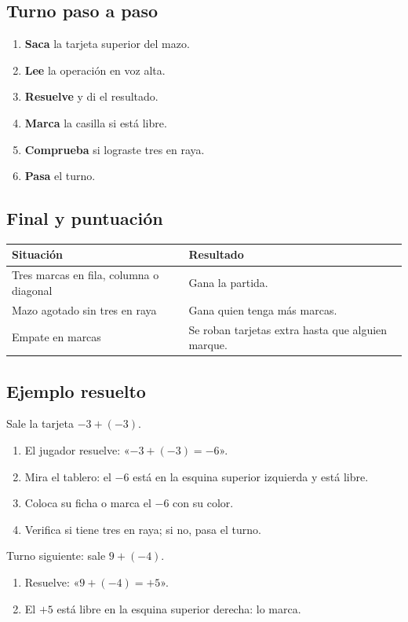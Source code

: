 \documentclass[12pt, letterpaper]{article}
\begin{document}
\subsection{Turno paso a paso}

\begin{enumerate}[leftmargin=*]
  \item \textbf{Saca} la tarjeta superior del mazo.
  \item \textbf{Lee} la operación en voz alta.
  \item \textbf{Resuelve} y di el resultado.
  \item \textbf{Marca} la casilla si está libre.
  \item \textbf{Comprueba} si lograste tres en raya.
  \item \textbf{Pasa} el turno.
\end{enumerate}

\subsection{Final y puntuación}

\begin{center}
\small
\begin{tabular}{@{}p{7.6cm} p{6.4cm}@{}}
\toprule
\textbf{Situación} & \textbf{Resultado}\\
\midrule
Tres marcas en fila, columna o diagonal & Gana la partida.\\
Mazo agotado sin tres en raya & Gana quien tenga más marcas.\\
Empate en marcas & Se roban tarjetas extra hasta que alguien marque.\\
\bottomrule
\end{tabular}
\end{center}

\subsection{Ejemplo resuelto}

Sale la tarjeta $-3+(-3)$.

\begin{cuadrosolucion}
\begin{enumerate}[leftmargin=*]
  \item El jugador resuelve: «$-3+(-3)=-6$».
  \item Mira el tablero: el $-6$ está en la esquina superior izquierda y está libre.
  \item Coloca su ficha o marca el $-6$ con su color.
  \item Verifica si tiene tres en raya; si no, pasa el turno.
\end{enumerate}
Turno siguiente: sale $9+(-4)$.
\begin{enumerate}[leftmargin=*]
  \item Resuelve: «$9+(-4)=+5$».
  \item El $+5$ está libre en la esquina superior derecha: lo marca.
\end{enumerate}
\end{cuadrosolucion}
\end{document}
